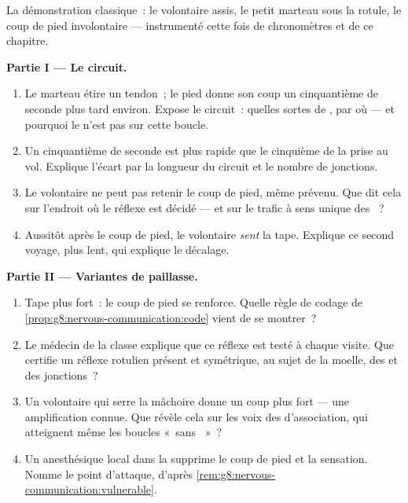 \begin{problem}\label{pb:g8:nervous-communication:1}
La démonstration classique~: le volontaire assis, le petit marteau
sous la rotule, le coup de pied involontaire --- instrumenté cette
fois de chronomètres et de ce chapitre.

\medskip\noindent\textbf{Partie I --- Le circuit.}
\begin{enumerate}
  \item Le marteau étire un tendon~; le pied donne son coup un
        cinquantième de seconde plus tard environ. Expose le
        circuit~: quelles sortes de , par où --- et pourquoi
        le  n'est pas sur cette boucle.
  \item Un cinquantième de seconde est plus rapide que le cinquième
        de la prise au vol. Explique l'écart par la longueur du
        circuit et le nombre de jonctions.
  \item Le volontaire ne peut pas retenir le coup de pied, même
        prévenu. Que dit cela sur l'endroit où le réflexe est décidé
        --- et sur le trafic à sens unique des ~?
  \item Aussitôt après le coup de pied, le volontaire \emph{sent} la
        tape. Explique ce second voyage, plus lent, qui explique le
        décalage.
\end{enumerate}

\medskip\noindent\textbf{Partie II --- Variantes de paillasse.}
\begin{enumerate}[resume]
  \item Tape plus fort~: le coup de pied se renforce. Quelle règle
        de codage de \cref{prop:g8:nervous-communication:code} vient
        de se montrer~?
  \item Le médecin de la classe explique que ce réflexe est testé à
        chaque visite. Que certifie un réflexe rotulien présent et
        symétrique, au sujet de la moelle, des  et des
        jonctions~?
  \item Un volontaire qui serre la mâchoire donne un coup plus fort
        --- une amplification connue. Que révèle cela sur les voix
        des  d'association, qui atteignent même les boucles
        «~sans ~»~?
  \item Un anesthésique local dans la  supprime le coup de pied
        et la sensation. Nomme le point d'attaque, d'après
        \cref{rem:g8:nervous-communication:vulnerable}.
\end{enumerate}


\end{problem}
